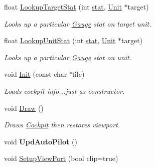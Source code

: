 \begin{DoxyCompactItemize}
\item 
float \hyperlink{classGameCockpit_a5efc1a5bcdfefbab56592858a749fe3e}{Lookup\+Target\+Stat} (int \hyperlink{structstat}{stat}, \hyperlink{classUnit}{Unit} $\ast$target)\hypertarget{classGameCockpit_a5efc1a5bcdfefbab56592858a749fe3e}{}\label{classGameCockpit_a5efc1a5bcdfefbab56592858a749fe3e}

\begin{DoxyCompactList}\small\item\em Looks up a particular \hyperlink{classGauge}{Gauge} stat on target unit. \end{DoxyCompactList}\item 
float \hyperlink{classGameCockpit_a4855231f4bcdc6deb2d9e9cf26fe42de}{Lookup\+Unit\+Stat} (int \hyperlink{structstat}{stat}, \hyperlink{classUnit}{Unit} $\ast$target)\hypertarget{classGameCockpit_a4855231f4bcdc6deb2d9e9cf26fe42de}{}\label{classGameCockpit_a4855231f4bcdc6deb2d9e9cf26fe42de}

\begin{DoxyCompactList}\small\item\em Looks up a particular \hyperlink{classGauge}{Gauge} stat on unit. \end{DoxyCompactList}\item 
void \hyperlink{classGameCockpit_ac6830c42b8dab613f34a7415fd936811}{Init} (const char $\ast$file)\hypertarget{classGameCockpit_ac6830c42b8dab613f34a7415fd936811}{}\label{classGameCockpit_ac6830c42b8dab613f34a7415fd936811}

\begin{DoxyCompactList}\small\item\em Loads cockpit info...just as constructor. \end{DoxyCompactList}\item 
void \hyperlink{classGameCockpit_a558479694454a63b1ec53f2df316e1ae}{Draw} ()\hypertarget{classGameCockpit_a558479694454a63b1ec53f2df316e1ae}{}\label{classGameCockpit_a558479694454a63b1ec53f2df316e1ae}

\begin{DoxyCompactList}\small\item\em Draws \hyperlink{classCockpit}{Cockpit} then restores viewport. \end{DoxyCompactList}\item 
void {\bfseries Upd\+Auto\+Pilot} ()\hypertarget{classGameCockpit_a5829510d1626a56f1524c388cf0629ed}{}\label{classGameCockpit_a5829510d1626a56f1524c388cf0629ed}

\item 
void \hyperlink{classGameCockpit_aeed9336123c6121fc87de959c35c1d4b}{Setup\+View\+Port} (bool clip=true)\hypertarget{classGameCockpit_aeed9336123c6121fc87de959c35c1d4b}{}\label{classGameCockpit_aeed9336123c6121fc87de959c35c1d4b}


\end{DoxyCompactItemize}
